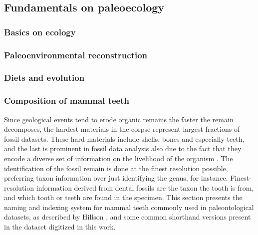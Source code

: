 \documentclass{article}
\begin{document}
\subsection{Fundamentals on paleoecology}

\subsubsection{Basics on ecology}

\subsubsection{Paleoenvironmental reconstruction}

\subsubsection{Diets and evolution}

\subsubsection{Composition of mammal teeth}


Since geological events tend to erode organic remains the faster the remain decomposes, the hardest materials in 
the corpse represent largest fractions of fossil datasets. These hard materials include shells, bones and especially teeth, and 
the last is prominent in fossil data analysis also due to the fact that they encode a diverse set of information on 
the livelihood of the organism \cite{Faith_Lyman_2019}. The identification of the fossil remain is done at the finest resolution possible,
preferring taxon information over just identifying the genus, for instance. Finest-resolution information 
derived from dental fossils are the taxon the tooth is from, and which tooth or teeth are found in the specimen.
This section presents the naming and indexing system for mammal teeth commonly used in paleontological datasets,
as described by Hillson \cite{Hillson_2005}, and some common shorthand versions present in the dataset digitized in this work.
\end{document}
